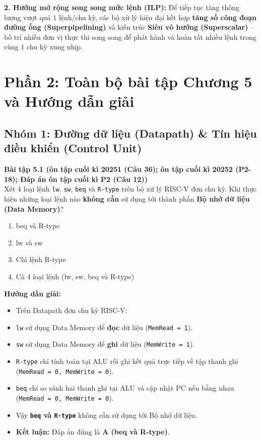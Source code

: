 \textbf{2. Hướng mở rộng song song mức lệnh (ILP):} Để tiếp tục tăng thông lượng vượt quá $1$ lệnh/chu kỳ, các bộ xử lý hiện đại kết hợp \textbf{tăng số công đoạn đường ống (Superpipelining)} và kiến trúc \textbf{Siêu vô hướng (Superscalar)} -- bố trí nhiều đơn vị thực thi song song để phát hành và hoàn tất nhiều lệnh trong cùng $1$ chu kỳ xung nhịp.

\newpage
\section{Phần 2: Toàn bộ bài tập Chương 5 và Hướng dẫn giải}


\subsection{Nhóm 1: Đường dữ liệu (Datapath) \& Tín hiệu điều khiển (Control Unit)}

\textbf{Bài tập 5.1 (ôn tập cuối kì 20251 (Câu 36); ôn tập cuối kì 20252 (P2-18); Đáp án ôn tập cuối kì P2 (Câu 12))}\\
Xét 4 loại lệnh \texttt{lw}, \texttt{sw}, \texttt{beq} và \texttt{R-type} trên bộ xử lý RISC-V đơn chu kỳ. Khi thực hiện những loại lệnh nào \textbf{không cần} sử dụng tới thành phần \textbf{Bộ nhớ dữ liệu (Data Memory)}?
\begin{enumerate}[label=\Alph*.]
    \item beq và R-type
    \item lw và sw
    \item Chỉ lệnh R-type
    \item Cả 4 loại lệnh (lw, sw, beq và R-type)
\end{enumerate}
\textbf{Hướng dẫn giải:}
\begin{itemize}
    \item Trên Datapath đơn chu kỳ RISC-V:
    \item \texttt{lw} sử dụng Data Memory để \textbf{đọc} dữ liệu (\texttt{MemRead = 1}).
    \item \texttt{sw} sử dụng Data Memory để \textbf{ghi} dữ liệu (\texttt{MemWrite = 1}).
    \item \texttt{R-type} chỉ tính toán tại ALU rồi ghi kết quả trực tiếp về tập thanh ghi (\texttt{MemRead = 0, MemWrite = 0}).
    \item \texttt{beq} chỉ so sánh hai thanh ghi tại ALU và cập nhật PC nếu bằng nhau (\texttt{MemRead = 0, MemWrite = 0}).
    \item Vậy \textbf{\texttt{beq} và \texttt{R-type}} không cần sử dụng tới Bộ nhớ dữ liệu.
    \item \textbf{Kết luận:} Đáp án đúng là \textbf{A (beq và R-type)}.
\end{itemize}

